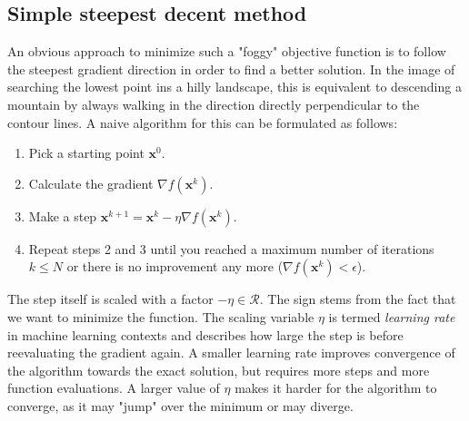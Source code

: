 \subsection{Simple steepest decent method}
An obvious approach to minimize such a "foggy" objective function is to follow the steepest gradient direction in order to find a better solution. In the image of searching the lowest point ins a hilly landscape, this is equivalent to descending a mountain by always walking in the direction directly perpendicular to the contour lines. 
A naive algorithm for this can be formulated as follows:
\begin{enumerate}
    \item Pick a starting point $\mathbf{x}^0$.
    \item Calculate the gradient $\nabla f(\mathbf{x}^k)$.
    \item Make a step $\mathbf{x}^{k+1} = \mathbf{x}^k -\eta \nabla f(\mathbf{x}^k)$.
    \item Repeat steps 2 and 3 until you reached a maximum number of iterations $k \le N$ or there is no improvement any more ($ \nabla f(\mathbf{x}^k) < \epsilon$). 
\end{enumerate}
The step itself is scaled with a factor $-\eta \in \mathcal{R}$. The sign stems from the fact that we want to minimize the function. The scaling variable $\eta$ is termed \emph{learning rate} in machine learning contexts and describes how large the step is before reevaluating the gradient again. A smaller learning rate improves convergence of the algorithm towards the exact solution, but requires more steps and more function evaluations. A larger value of $\eta$ makes it harder for the algorithm to converge, as it may "jump" over the minimum or may diverge. 

